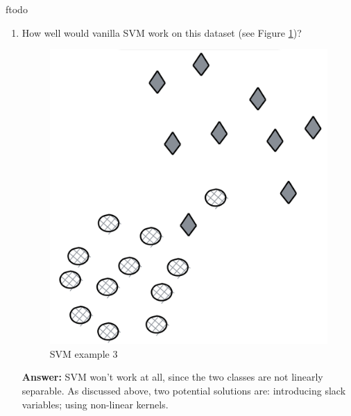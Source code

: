 ƒtodo\documentclass{article}
\newenvironment{QandA}{\begin{enumerate}[label=\arabic*.]}{\end{enumerate}}
\newenvironment{InnerQandA}{\begin{enumerate}[label=\roman*.]}{\end{enumerate}}
\newenvironment{answer}{\par\normalfont \textbf{Answer:}}{}
\begin{document}
\begin{QandA}
\begin{InnerQandA}
        \item How well would vanilla SVM work on this dataset (see Figure \ref{fig:svm-example-3})?
        \begin{figure}[htb!]
            \centering
            \includegraphics[width=0.3\columnwidth]{img/svm-example-3.png}
            \caption{SVM example 3}
            \label{fig:svm-example-3}
        \end{figure}
        \begin{answer}
            SVM won't work at all, since the two classes are not linearly separable. As discussed above, two potential solutions are: introducing slack variables; using non-linear kernels.
        \end{answer}
    \end{InnerQandA}
    
\end{QandA}
\end{document}
